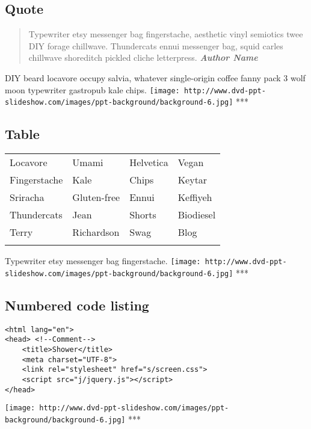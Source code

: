 \documentclass[]{article}
\begin{document}
\subsection{Quote}\label{quote}

\begin{quote}
Typewriter etsy messenger bag fingerstache, aesthetic vinyl semiotics
twee DIY forage chillwave. Thundercats ennui messenger bag, squid carles
chillwave shoreditch pickled cliche letterpress. \emph{\textbf{Author
Name}}
\end{quote}

DIY beard locavore occupy salvia, whatever single-origin coffee fanny
pack 3 wolf moon typewriter gastropub kale chips.
\texttt{[image: http://www.dvd-ppt-slideshow.com/images/ppt-background/background-6.jpg]}
***

\subsection{Table}\label{table}

\begin{longtable}[c]{@{}llll@{}}
\toprule\addlinespace
Locavore & Umami & Helvetica & Vegan
\\\addlinespace
\midrule\endhead
Fingerstache & Kale & Chips & Keytar
\\\addlinespace
Sriracha & Gluten-free & Ennui & Keffiyeh
\\\addlinespace
Thundercats & Jean & Shorts & Biodiesel
\\\addlinespace
Terry & Richardson & Swag & Blog
\\\addlinespace
\bottomrule
\end{longtable}

Typewriter etsy messenger bag fingerstache.
\texttt{[image: http://www.dvd-ppt-slideshow.com/images/ppt-background/background-6.jpg]}
***

\subsection{Numbered code listing}\label{numbered-code-listing}

\begin{verbatim}
<html lang="en">
<head> <!--Comment-->
    <title>Shower</title>
    <meta charset="UTF-8">
    <link rel="stylesheet" href="s/screen.css">
    <script src="j/jquery.js"></script>
</head>
\end{verbatim}

\texttt{[image: http://www.dvd-ppt-slideshow.com/images/ppt-background/background-6.jpg]}
***
\end{document}
